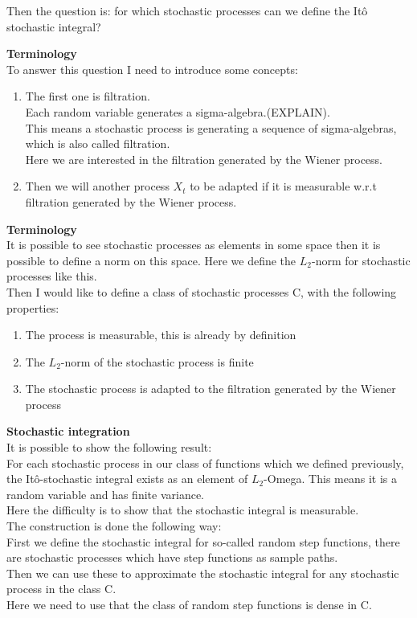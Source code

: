 \documentclass[10pt,a4paper,titlepage, openany]{memoir} %
\begin{document}
Then the question is: for which stochastic processes can we define the It\^o stochastic integral?


\textbf{Terminology}\\
To answer this question I need to introduce some concepts:
\begin{enumerate}
\item The first one is filtration.\\
Each random variable generates a sigma-algebra.(EXPLAIN).\\
This means a stochastic process is generating a sequence of sigma-algebras, which is also called filtration.\\
Here we are interested in the filtration generated by the Wiener process.
\item Then we will another process \(X_t\) to be adapted if it is measurable w.r.t filtration generated by the Wiener process.
\end{enumerate}



\textbf{Terminology}\\
It is possible to see stochastic processes as elements in some space then it is possible to define a norm on this space. Here we define the \(L_2\)-norm for stochastic processes like this.\\
Then I would like to define a class of stochastic processes C, with the following properties:
\begin{enumerate}
\item The process is measurable, this is already by definition
\item The \(L_2\)-norm of the stochastic process is finite
\item The stochastic process is adapted to the filtration generated by the Wiener process
\end{enumerate}


\textbf{Stochastic integration}\\
It is possible to show the following result:\\
For each stochastic process in our class of functions which we defined previously, the It\^o-stochastic integral exists as an element of \(L_2\)-Omega. This means it is a random variable and has finite variance.\\
Here the difficulty is to show that the stochastic integral is measurable.\\

The construction is done the following way:\\
First we define the stochastic integral for so-called random step functions, there are stochastic processes which have step functions as sample paths.\\
Then we can use these to approximate the stochastic integral for any stochastic process in the class C.\\
Here we need to use that the class of random step functions is dense in C.
\end{document}

